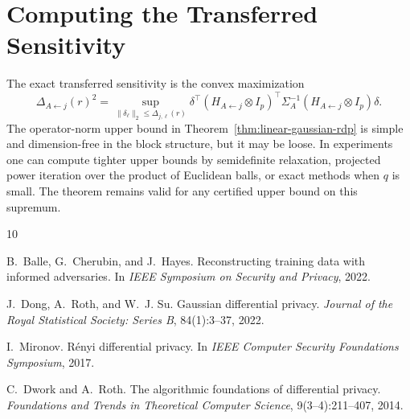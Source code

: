 \documentclass[conference,compsoc]{IEEEtran}
\begin{document}
\section{Computing the Transferred Sensitivity}
\label{app:computing-delta}

The exact transferred sensitivity is the convex maximization
\[
\Delta_{A\leftarrow j}(r)^2
=
\sup_{\|\delta_\ell\|_2\le\Delta_{j,\ell}(r)}
\delta^\top
(H_{A\leftarrow j}\otimes I_p)^\top\Sigma_A^{-1}(H_{A\leftarrow j}\otimes I_p)
\delta.
\]
The operator-norm upper bound in Theorem~\ref{thm:linear-gaussian-rdp} is simple and dimension-free in the block structure, but it may be loose. In experiments one can compute tighter upper bounds by semidefinite relaxation, projected power iteration over the product of Euclidean balls, or exact methods when $q$ is small. The theorem remains valid for any certified upper bound on this supremum.

\begin{thebibliography}{10}

B.~Balle, G.~Cherubin, and J.~Hayes.
\newblock Reconstructing training data with informed adversaries.
\newblock In \emph{IEEE Symposium on Security and Privacy}, 2022.

J.~Dong, A.~Roth, and W.~J. Su.
\newblock Gaussian differential privacy.
\newblock \emph{Journal of the Royal Statistical Society: Series B}, 84(1):3--37, 2022.

I.~Mironov.
\newblock R\'enyi differential privacy.
\newblock In \emph{IEEE Computer Security Foundations Symposium}, 2017.

C.~Dwork and A.~Roth.
\newblock The algorithmic foundations of differential privacy.
\newblock \emph{Foundations and Trends in Theoretical Computer Science}, 9(3--4):211--407, 2014.

\end{thebibliography}
\end{document}
